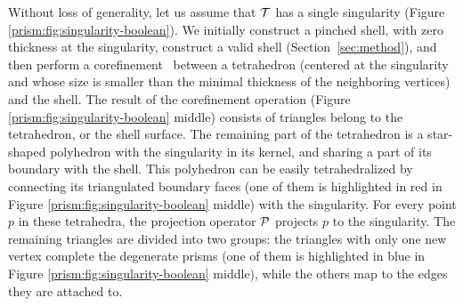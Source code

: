 Without loss of generality, let us assume that $\T$ has a single singularity (Figure \ref{prism:fig:singularity-boolean}). We initially construct a pinched shell, with zero thickness at the singularity, construct a valid shell (Section~\ref{sec:method}), and then perform a corefinement~\cite{corefinement} between a tetrahedron (centered at the singularity and whose size is smaller than the minimal thickness of the neighboring vertices) and the shell. The result of the corefinement operation (Figure \ref{prism:fig:singularity-boolean} middle) consists of triangles belong to the tetrahedron, or the shell surface. The remaining part of the tetrahedron is a star-shaped polyhedron with the singularity in its kernel, and sharing a part of its boundary with the shell. This polyhedron can be easily tetrahedralized by connecting its triangulated boundary faces (one of them is highlighted in red in Figure \ref{prism:fig:singularity-boolean} middle) with the singularity. For every point $p$ in these tetrahedra, the projection operator $\P$ projects $p$ to the singularity. The remaining triangles are divided into two groups: 
the triangles with only one new vertex complete the degenerate prisms (one of them is highlighted in blue in Figure \ref{prism:fig:singularity-boolean} middle), 
while the others map to the edges they are attached to.





